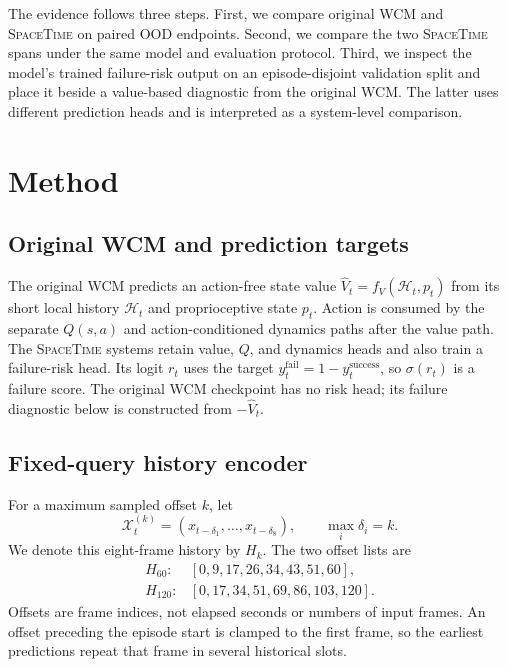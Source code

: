 \documentclass[10pt,a4paper]{article}
\newcommand{\SpaceTime}{\textsc{SpaceTime}}
\newcommand{\WCM}{\textsc{WCM}}
\begin{document}
The evidence follows three steps. First, we compare original WCM and \SpaceTime{} on paired OOD endpoints. Second, we compare the two \SpaceTime{} spans under the same model and evaluation protocol. Third, we inspect the model's trained failure-risk output on an episode-disjoint validation split and place it beside a value-based diagnostic from the original WCM. The latter uses different prediction heads and is interpreted as a system-level comparison.

\section{Method}

\subsection{Original WCM and prediction targets}

The original \WCM{} predicts an action-free state value $\hat V_t=f_V(\mathcal{H}_t,p_t)$ from its short local history $\mathcal{H}_t$ and proprioceptive state $p_t$. Action is consumed by the separate $Q(s,a)$ and action-conditioned dynamics paths after the value path. The \SpaceTime{} systems retain value, $Q$, and dynamics heads and also train a failure-risk head. Its logit $r_t$ uses the target $y_t^{\mathrm{fail}}=1-y_t^{\mathrm{success}}$, so $\sigma(r_t)$ is a failure score. The original WCM checkpoint has no risk head; its failure diagnostic below is constructed from $-\hat V_t$.

\subsection{Fixed-query history encoder}

For a maximum sampled offset $k$, let
\begin{equation}
\mathcal{X}^{(k)}_t=\left(x_{t-\delta_1},\ldots,x_{t-\delta_8}\right),
\qquad \max_i\delta_i=k.
\end{equation}
We denote this eight-frame history by $H_k$. The two offset lists are
\begin{align}
H_{60}:  &[0,9,17,26,34,43,51,60],\\
H_{120}: &[0,17,34,51,69,86,103,120].
\end{align}
Offsets are frame indices, not elapsed seconds or numbers of input frames. An offset preceding the episode start is clamped to the first frame, so the earliest predictions repeat that frame in several historical slots.
\end{document}
